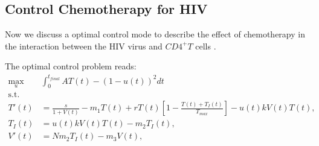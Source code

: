 \subsection{Control Chemotherapy for HIV} 
	Now we discuss a optimal control mode to describe the effect of chemotherapy
in the interaction between the HIV virus and $CD4^+T$ cells 
\cite{butler1997optimal}.

The optimal control problem reads:
\begin{equation} \label{eqn:hiv_infect}
	\begin{aligned}
		\max_{u} & \int_{0}^{t_{final}}
			A  T(t) - (1-u(t)) ^ 2 dt
		\\
		\text{s.t. }
		\\
			T'(t) &=
				\frac{s}{1 + V(t)}
				- m_1 T(t) 
				+ r T(t)
				\left[
					1 - \frac{T(t)+ T_{I}(t)}{T_{max}}
				\right] 
				- u(t) k V(t) T(t),
			\\
			T_{I}(t) &=
				u(t) k V(t) T(t) - m_2 T_{I}(t),
			\\
			V'(t) &= N m_2 T_{I}(t) - m_3 V(t),
			\\
	\end{aligned}
\end{equation}



